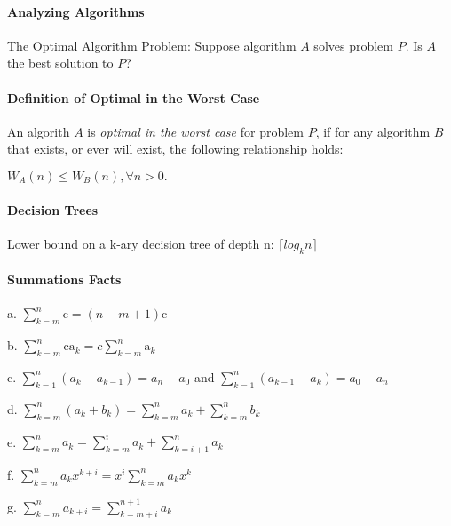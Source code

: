 \documentclass[10pt,twocolumn]{article}
\newenvironment{packed_list}{
\begin{itemize}
  \setlength{\itemsep}{1pt}
  \setlength{\parskip}{0pt}
  \setlength{\parsep}{0pt}
}{\end{itemize}}
\begin{document}
	\paragraph*{Analyzing Algorithms}
	The Optimal Algorithm Problem: Suppose algorithm $A$ solves
        problem $P$. Is $A$ the best solution to $P$?
	
	\paragraph*{Definition of Optimal in the Worst Case} An algorith
        $A$ is \emph{optimal in the worst case} for problem $P$, if
        for any algorithm $B$ that exists, or ever will exist, the
        following relationship holds:
	\begin{center}$W_A(n)\leq W_B(n),\forall n>0.$\end{center}
	
	\paragraph*{Decision Trees}
	Lower bound on a k-ary decision tree of depth n: $\lceil log_k n\rceil$
	
	\paragraph*{Summations Facts}
        \begin{packed_list}
	\item[a.] $ \sum_{k=m}^n \mathrm{c} = (n - m + 1)\mathrm{c}$ 
	\item[b.] $ \sum_{k=m}^n \mathrm{c a_\mathit{k}} = c
	\sum_{k=m}^n \mathrm{a_\mathit{k}}$
	\item[c.] $\sum_{k=1}^n (a_\mathit{k} - a_\mathit{k - 1}) =
	a_\mathit{n} - a_\mathit{0}$ 
		and $ \sum_{k=1}^n
	(a_\mathit{k - 1} - a_\mathit{k}) = a_\mathit{0} - a_\mathit{n}$
	\item[d.] $\sum_{k=m}^n (a_\mathit{k} + b_\mathit{k}) =
	\sum_{k=m}^n a_\mathit{k} + \sum_{k=m}^n
	b_\mathit{k}$
	\item[e.] $\sum_{k=m}^n a_\mathit{k} = \sum_{k=m}^i
	a_\mathit{k} +  \sum_{k=i+1}^n a_\mathit{k}$
	\item[f.] $\sum_{k=m}^n a_\mathit{k}x^\mathit{k+i} = 
	x^\mathit{i} \sum_{k=m}^n a_\mathit{k}x^\mathit{k}$
	\item[g.] $\sum_{k=m}^n a_\mathit{k+i} = \sum_{k=m+i}^{n+1}
	a_\mathit{k}$
        \end{packed_list}
\end{document}
